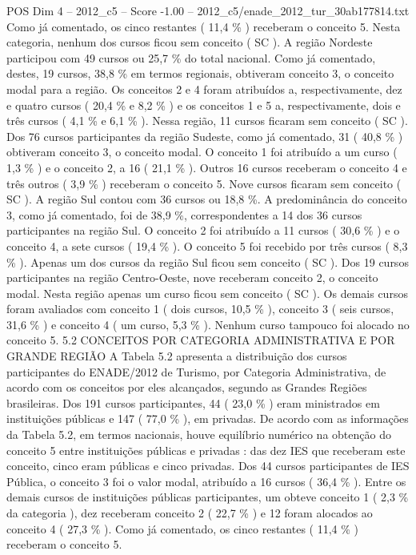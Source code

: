 \begin{textsample}{POS Dim 4 – 2012\_c5 – Score -1.00 – 2012\_c5/enade\_2012\_tur\_30ab177814.txt}
Como já comentado, os cinco restantes ( 11,4 \% ) receberam o conceito 5.
Nesta categoria, nenhum dos cursos ficou sem conceito ( SC ).
A região Nordeste participou com 49 cursos ou 25,7 \% do total nacional.
Como já comentado, destes, 19 cursos, 38,8 \% em termos regionais, obtiveram conceito 3, o conceito modal para a região.
Os conceitos 2 e 4 foram atribuídos a, respectivamente, dez e quatro cursos ( 20,4 \% e 8,2 \% ) e os conceitos 1 e 5 a, respectivamente, dois e três cursos ( 4,1 \% e 6,1 \% ).
Nessa região, 11 cursos ficaram sem conceito ( SC ).
Dos 76 cursos participantes da região Sudeste, como já comentado, 31 ( 40,8 \% ) obtiveram conceito 3, o conceito modal.
O conceito 1 foi atribuído a um curso ( 1,3 \% ) e o conceito 2, a 16 ( 21,1 \% ).
Outros 16 cursos receberam o conceito 4 e três outros ( 3,9 \% ) receberam o conceito 5.
Nove cursos ficaram sem conceito ( SC ).
A região Sul contou com 36 cursos ou 18,8 \%.
A predominância do conceito 3, como já comentado, foi de 38,9 \%, correspondentes a 14 dos 36 cursos participantes na região Sul.
O conceito 2 foi atribuído a 11 cursos ( 30,6 \% ) e o conceito 4, a sete cursos ( 19,4 \% ).
O conceito 5 foi recebido por três cursos ( 8,3 \% ).
Apenas um dos cursos da região Sul ficou sem conceito ( SC ).
Dos 19 cursos participantes na região Centro-Oeste, nove receberam conceito 2, o conceito modal.
Nesta região apenas um curso ficou sem conceito ( SC ).
Os demais cursos foram avaliados com conceito 1 ( dois cursos, 10,5 \% ), conceito 3 ( seis cursos, 31,6 \% ) e conceito 4 ( um curso, 5,3 \% ).
Nenhum curso tampouco foi alocado no conceito 5. 5.2 CONCEITOS POR CATEGORIA ADMINISTRATIVA E POR GRANDE REGIÃO A Tabela 5.2 apresenta a distribuição dos cursos participantes do ENADE/2012 de Turismo, por Categoria Administrativa, de acordo com os conceitos por eles alcançados, segundo as Grandes Regiões brasileiras.
Dos 191 cursos participantes, 44 ( 23,0 \% ) eram ministrados em instituições públicas e 147 ( 77,0 \% ), em privadas.
De acordo com as informações da Tabela 5.2, em termos nacionais, houve equilíbrio numérico na obtenção do conceito 5 entre instituições públicas e privadas : das dez IES que receberam este conceito, cinco eram públicas e cinco privadas.
Dos 44 cursos participantes de IES Pública, o conceito 3 foi o valor modal, atribuído a 16 cursos ( 36,4 \% ).
Entre os demais cursos de instituições públicas participantes, um obteve conceito 1 ( 2,3 \% da categoria ), dez receberam conceito 2 ( 22,7 \% ) e 12 foram alocados ao conceito 4 ( 27,3 \% ).
Como já comentado, os cinco restantes ( 11,4 \% ) receberam o conceito 5.

\end{textsample}
